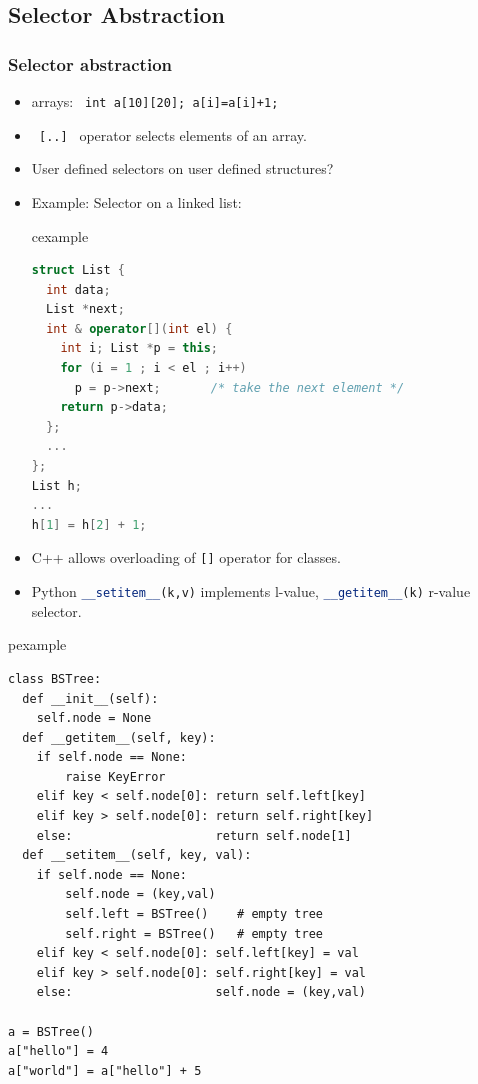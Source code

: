\subsection{Selector Abstraction}
\begin{frame}[fragile]
\frametitle{Selector abstraction}
\begin{itemize}[<+->]
 \item arrays: \texttt{ int a[10][20];  a[i]=a[i]+1;}
 \item \texttt{ [..] } operator selects elements of an array.
 \item User defined selectors on user defined structures?
 \item Example: Selector on a linked list:
\begin{beamercolorbox}{cexample}\noindent
\begin{lstlisting}[language={C++},escapechar=\#]
struct List {
  int data;
  List *next;
  int & operator[](int el) {
    int i; List *p = this;
    for (i = 1 ; i < el ; i++) 
      p = p->next;       /* take the next element */
    return p->data;
  };
  ...
};
List h;
...
h[1] = h[2] + 1;
\end{lstlisting}
\end{beamercolorbox}
\item C++ allows overloading of \texttt{[]} operator for classes.
\end{itemize}
\end{frame}

\begin{frame}[fragile]
\begin{itemize}
\item {\small Python \lstinline[language=Python]{__setitem__(k,v)} implements l-value,
\lstinline[language=Python]{__getitem__(k)} r-value selector.}
\end{itemize}
\begin{beamercolorbox}{pexample}\noindent
\begin{lstlisting}
class BSTree:
  def __init__(self):
    self.node = None
  def __getitem__(self, key):
    if self.node == None:
        raise KeyError
    elif key < self.node[0]: return self.left[key]
    elif key > self.node[0]: return self.right[key]
    else:                    return self.node[1]
  def __setitem__(self, key, val):
    if self.node == None:
        self.node = (key,val)
        self.left = BSTree()    # empty tree
        self.right = BSTree()   # empty tree
    elif key < self.node[0]: self.left[key] = val
    elif key > self.node[0]: self.right[key] = val
    else:                    self.node = (key,val)

a = BSTree()
a["hello"] = 4
a["world"] = a["hello"] + 5
\end{lstlisting}
\end{beamercolorbox}
\end{frame}

